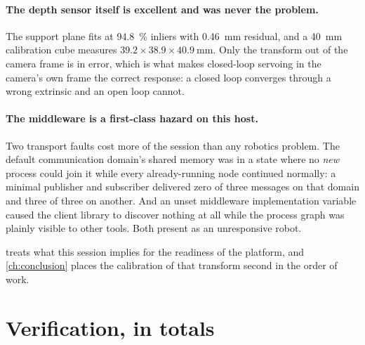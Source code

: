 \paragraph{The depth sensor itself is excellent and was never the problem.}
The support plane fits at \SI{94.8}{\percent} inliers with
\SI{0.46}{\milli\metre} residual, and a \SI{40}{\milli\metre} calibration cube
measures $39.2 \times 38.9 \times \SI{40.9}{\milli\metre}$. Only the transform
out of the camera frame is in error, which is what makes closed-loop servoing
in the camera's own frame the correct response: a closed loop converges
through a wrong extrinsic and an open loop cannot.

\paragraph{The middleware is a first-class hazard on this host.} Two transport
faults cost more of the session than any robotics problem. The default
communication domain's shared memory was in a state where no \emph{new}
process could join it while every already-running node continued normally: a
minimal publisher and subscriber delivered zero of three messages on that
domain and three of three on another. And an unset middleware implementation
variable caused the client library to discover nothing at all while the
process graph was plainly visible to other tools. Both present as an
unresponsive robot.

 treats what this session implies for the readiness of the
platform, and \cref{ch:conclusion} places the calibration of that transform
second in the order of work.

\section{Verification, in totals}

